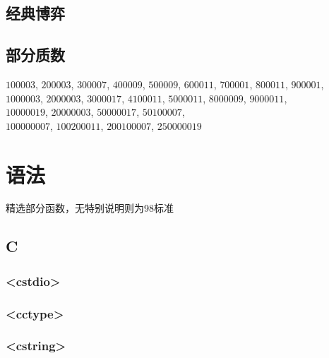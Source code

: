 \documentclass[10pt]{article}
\begin{document}
\subsection{经典博弈}


\subsection{部分质数}
\noindent
$100003$, $200003$, $300007$, $400009$, $500009$, $600011$, $700001$, $800011$, $900001$, \\
$1000003$, $2000003$, $3000017$, $4100011$, $5000011$, $8000009$, $9000011$, \\
$10000019$, $20000003$, $50000017$, $50100007$, \\
$100000007$, $100200011$, $200100007$, $250000019$
\section{语法}
精选部分函数，无特别说明则为98标准
\subsection{C}
\subsubsection{<cstdio>}


\subsubsection{<cctype>}


\subsubsection{<cstring>}


%
\end{document}
